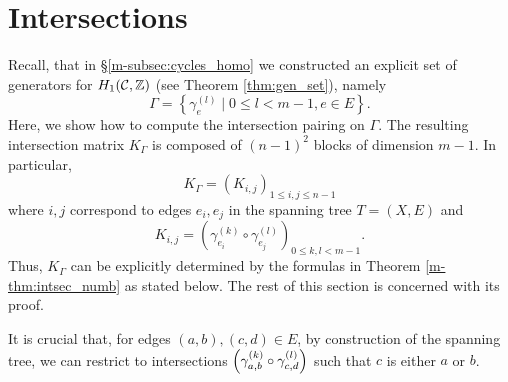\documentclass[main.tex]{subfiles}
\begin{document}
  \section{Intersections}\label{sec:intersections}

  Recall, that in \S \ref{m-subsec:cycles_homo} we constructed an explicit set of generators for $H_1(\mathcal{C},\mathbb{Z})$ (see Theorem
  \ref{thm:gen_set}), namely
  \begin{equation*}
    \Gamma = \left\{  \gamma_{e}^{(l)}  \mid  0 \le l < m-1,  e \in E  \right\}.
  \end{equation*}
  Here, we show how to compute the intersection pairing on $\Gamma$. The resulting intersection matrix $K_{\Gamma}$ is composed of
  $(n-1)^2$ blocks of dimension $m-1$. In particular,
  \begin{equation*}
   K_{\Gamma} = \left( K_{i,j} \right)_{1\le i,j \le n-1}
  \end{equation*}
  where $i,j$ correspond to edges $e_i,e_j$ in the spanning tree $T = (X,E)$ and
  \begin{equation*}
    K_{i,j} = \left(\gamma_{e_i}^{(k)} \circ \gamma_{e_j}^{(l)} \right)_{0 \le k,l < m-1}.
  \end{equation*}
  Thus, $K_{\Gamma}$ can be explicitly determined by the formulas in Theorem \ref{m-thm:intsec_numb} as stated below.
  The rest of this section is concerned with its proof.

  It is crucial that, for edges $(a,b),(c,d) \in E$, by construction of the spanning tree, we can restrict to intersections $\left(\gamma_{a,b}^{(k)} \circ \gamma_{c,d}^{(l)}\right)$ 
  such that $c$ is either $a$ or $b$.
\end{document}
